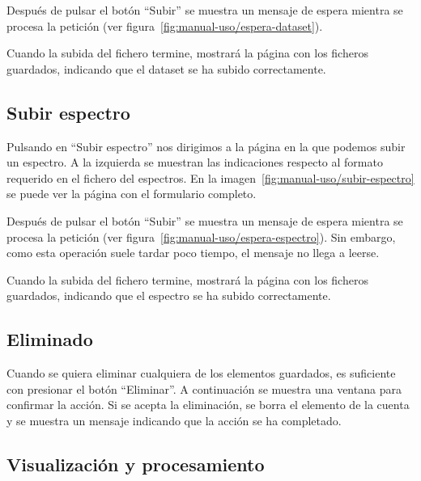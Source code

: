 
 Después de pulsar el botón ``Subir'' se muestra un mensaje 
de espera mientra se procesa la petición (ver 
figura~\ref{fig:manual-uso/espera-dataset}).


Cuando la subida del fichero termine, mostrará la página con los ficheros 
guardados, indicando que el dataset se ha subido correctamente.

\subsection{Subir espectro}

Pulsando en ``Subir espectro'' nos dirigimos a la página en la que podemos 
subir un espectro. A la izquierda se muestran las indicaciones respecto al 
formato requerido en el fichero del espectros. En la 
imagen~\ref{fig:manual-uso/subir-espectro} se puede ver la página con el 
formulario completo.


Después de pulsar el botón ``Subir'' se muestra un mensaje 
de espera mientra se procesa la petición (ver 
figura~\ref{fig:manual-uso/espera-espectro}). Sin embargo, como esta operación 
suele tardar poco tiempo, el mensaje no llega a leerse.


Cuando la subida del fichero termine, mostrará la página con los ficheros 
guardados, indicando que el espectro se ha subido correctamente.

\subsection{Eliminado}

Cuando se quiera eliminar cualquiera de los elementos guardados, es suficiente 
con presionar el botón ``Eliminar''. A continuación se muestra una ventana para 
confirmar la acción. Si se acepta la eliminación, se borra el elemento de la 
cuenta y se muestra un mensaje indicando que la acción se ha completado.

\subsection{Visualización y procesamiento}

